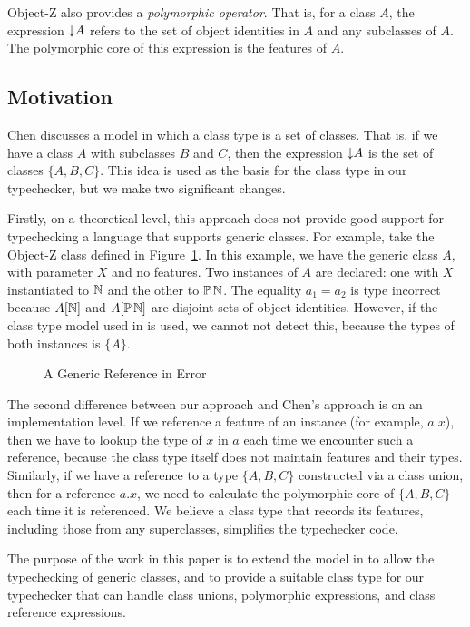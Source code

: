 Object-Z also provides a {\em polymorphic operator}. That is, for a
class $A$, the expression $\mathord\downarrow A$ refers to the set of object
identities in $A$ and any subclasses of $A$. The polymorphic core of
this expression is the features of $A$.

\subsection{Motivation}

Chen \cite{chen94} discusses a model in which a class type is a set of
classes. That is, if we have a class $A$ with subclasses $B$ and $C$,
then the expression $\mathord\downarrow A$ is the set of classes $\{A, B,
C\}$. This idea is used as the basis for the class type in our
typechecker, but we make two significant changes.

Firstly, on a theoretical level, this approach does not provide good
support for typechecking a language that supports generic classes. For
example, take the Object-Z class defined in
Figure~\ref{generic-class-A}.  In this example, we have the generic
class $A$, with parameter $X$ and no features.  Two
instances of $A$ are declared: one with $X$ instantiated to ${\mathbb N}$ and
the other to $\power \nat$. The equality $a_{1} = a_{2}$ is type
incorrect because $A[{\mathbb N}]$ and $A[\power \nat]$ are disjoint sets of
object identities. However, if the class type model used in
\cite{chen94} is used, we cannot not detect this, because the types of
both instances is $\{A\}$.

\begin{figure}[t]

\caption{A Generic Reference in Error}
\label{generic-class-A}
\end{figure}


The second difference between our approach and Chen's approach is on
an implementation level. If we reference a feature of an instance (for
example, $a.x$), then we have to lookup the type of $x$ in $a$ each
time we encounter such a reference, because the class type itself does
not maintain features and their types.  Similarly, if we have a
reference to a type $\{ A, B, C\}$ constructed via a class union, then
for a reference $a.x$, we need to calculate the polymorphic core of
$\{A,B,C\}$ each time it is referenced. We believe a class type that
records its features, including those from any superclasses,
simplifies the typechecker code.

The purpose of the work in this paper is to extend the model in
\cite{chen94} to allow the typechecking of generic classes, and to
provide a suitable class type for our typechecker that can handle
class unions, polymorphic expressions, and class reference
expressions.
